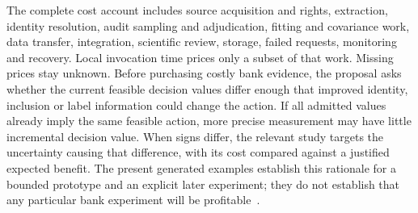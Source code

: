The complete cost account includes source acquisition and rights, extraction,
identity resolution, audit sampling and adjudication, fitting and covariance
work, data transfer, integration, scientific review, storage, failed requests,
monitoring and recovery. Local invocation time prices only a subset of that
work. Missing prices stay unknown. Before purchasing costly bank evidence,
the proposal asks whether the current feasible decision values differ enough
that improved identity, inclusion or label information could change the action.
If all admitted values already imply the same feasible action, more precise
measurement may have little incremental decision value. When signs differ,
the relevant study targets the uncertainty causing that difference, with
its cost compared against a justified expected benefit. The present generated
examples establish this rationale for a bounded prototype and an explicit
later experiment; they do not establish that any particular bank experiment
will be profitable~\citep{exec13_observation_design,exec13_observation_exact}.
\label{exec13:observation-journey-end}
